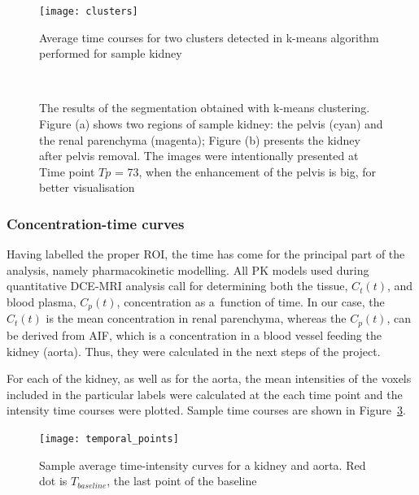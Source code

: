 \begin{figure}[H]
	\centering
	\texttt{[image: clusters]}
	
\caption[Average time courses for two clusters detected in k-means algorithm]{Average time courses for two clusters detected in k-means algorithm performed for sample kidney}
\label{fig:clusters}
\end{figure}

\begin{figure}[H]
\captionsetup[subfloat]{captionskip=0.5cm}
	\centering
	\hspace{0.02\textwidth}
	\\	
\vspace{0.5cm}
\caption[Sample kidney segmentation with k-means clustering]{The results of the segmentation obtained with k-means clustering. Figure (a) shows two regions of sample kidney: the pelvis (cyan) and the renal parenchyma (magenta); Figure (b) presents the kidney after pelvis removal. The images were intentionally presented at Time point $Tp$ = 73, when the enhancement of the pelvis is big, for better visualisation}
\label{fig:segmentation}
\end{figure}

\subsubsection{Concentration-time curves}
Having labelled the proper ROI, the time has come for the principal part of the analysis, namely pharmacokinetic modelling.
All PK models used during quantitative DCE-MRI analysis call for determining both the tissue, $C_t(t)$, and blood plasma, $C_p(t)$, concentration as a~function of time. In our case, the $C_t(t)$ is the mean concentration in renal parenchyma, whereas the
$C_p(t)$, can be derived from  AIF, which is a concentration in a blood vessel feeding the kidney (aorta).
Thus, they were calculated in the next steps of the project.  

For each of the kidney, as well as for the aorta, the mean intensities of the voxels included in the particular labels were calculated at the each time point and the intensity time courses were plotted. Sample time courses are shown in Figure~\ref{fig:temporal_points}.

\vspace{10pt}
\begin{figure}[H]
	\centering
	\texttt{[image: temporal\_points]}
	
\caption[Sample average time-intensity curves for a kidney and aorta with marked last points of the baseline]{Sample average time-intensity curves for a kidney and aorta. Red dot is $T_{baseline}$, the last point of the baseline}
\label{fig:temporal_points}
\end{figure}





